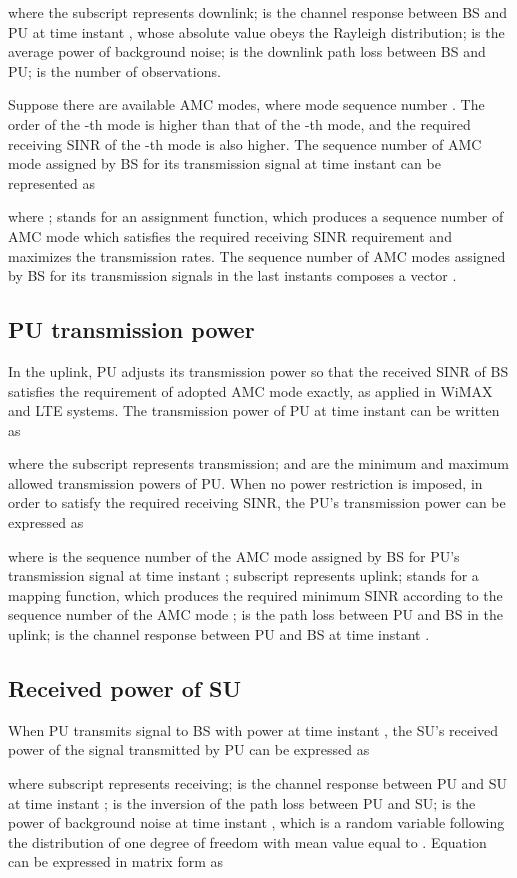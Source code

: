 \documentclass[conference]{IEEEtran}
\begin{document}
where the subscript  represents downlink;  is the
channel response between BS and PU at time instant , whose
absolute value obeys the Rayleigh distribution;  is the
average power of background noise;  is the downlink path
loss between BS and PU;  is the number of observations.

Suppose there are  available AMC modes, where mode sequence
number . The order of the -th mode is
higher than that of the -th mode, and the required receiving SINR
of the -th mode is also higher. The sequence number of AMC
mode assigned by BS for its transmission signal at time instant 
can be represented as

where ; 
stands for an assignment function, which produces a sequence number
of AMC mode which satisfies the required receiving SINR requirement
and maximizes the transmission rates. The sequence number of AMC
modes assigned by BS for its transmission signals in the last 
instants composes a vector .
\subsection{PU transmission power}
In the uplink, PU adjusts its transmission power so that the
received SINR of BS satisfies the requirement of adopted AMC mode
exactly, as applied in WiMAX and LTE systems. The transmission power
of PU at time instant  can be written as

where the subscript  represents transmission;  and
 are the minimum and maximum allowed transmission powers
of PU. When no power restriction is imposed, in order to satisfy the
required receiving SINR, the PU's transmission power can be
expressed as

where  is the sequence number of the AMC mode assigned by
BS for PU's transmission signal at time instant ; subscript 
represents uplink;  stands for a mapping
function, which produces the required minimum SINR according to the
sequence number of the AMC mode ;  is the path loss
between PU and BS in the uplink;  is the channel response
between PU and BS at time instant .
\subsection{Received power of SU}
When PU transmits signal to BS with power  at time instant
, the SU's received power of the signal transmitted by PU can be
expressed as

where subscript  represents receiving;   is the channel
response between PU and SU at time instant ;  is the inversion
of the path loss between PU and SU;  is the power of
background noise at time instant , which is a random variable
following the  distribution of one degree of freedom with
mean value equal to  . Equation  can be expressed in
matrix form as
\end{document}
